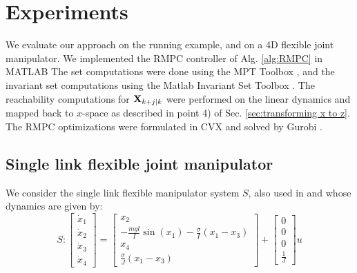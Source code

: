 \section{Experiments}
\label{sec:simulations}

We evaluate our approach on the running example, and on a 4D flexible joint manipulator.
We implemented the RMPC controller of Alg. \ref{alg:RMPC} in MATLAB
The set computations were done using the MPT Toolbox \cite{MPT3}, and the invariant set computations using the Matlab Invariant Set Toolbox \cite{IST}. 
The reachability computations for $\mathbf{X}_{k+j|k}$ were performed on the linear dynamics and mapped back to $x$-space as described in point 4) of Sec. \ref{sec:transforming x to z}. 
The RMPC optimizations were formulated in CVX \cite{cvx} and solved by Gurobi \cite{gurobi}.

\subsection{Single link flexible joint manipulator}
\label{sec:manipulator}


We consider the single link flexible manipulator system $S$, also used in  \cite{parameter} and \cite{intech}
whose dynamics are given by:
\begin{equation}
S: \begin{bmatrix} \dot{x}_1 \\ \dot{x}_2 \\ \dot{x}_3 \\ \dot{x}_4    \end{bmatrix} = \begin{bmatrix} x_2 \\ -\frac{mgl}{I}\sin(x_1) - \frac{\sigma}{I}(x_1-x_3)  \\ x_4 \\ \frac{\sigma}{J}(x_1-x_3)  \end{bmatrix} + \begin{bmatrix} 0 \\ 0 \\ 0 \\ \frac{1}{J} \end{bmatrix}u \nonumber
\end{equation}

